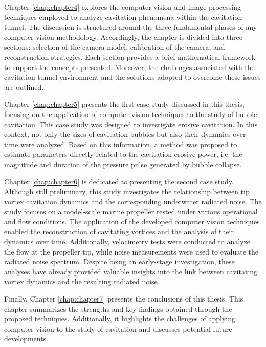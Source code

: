 Chapter \ref{chap:chapter4} explores the computer vision and image processing techniques employed to analyze cavitation phenomena within the cavitation tunnel. The discussion is structured around the three fundamental phases of any computer vision methodology. Accordingly, the chapter is divided into three sections: selection of the camera model, calibration of the camera, and reconstruction strategies. Each section provides a brief mathematical framework to support the concepts presented. Moreover, the challenges associated with the cavitation tunnel environment and the solutions adopted to overcome these issues are outlined.

Chapter \ref{chap:chapter5} presents the first case study discussed in this thesis, focusing on the application of computer vision techniques to the study of bubble cavitation.
This case study was designed to investigate erosive cavitation. In this context, not only the sizes of cavitation bubbles but also their dynamics over time were analyzed. Based on this information, a method was proposed to estimate parameters directly related to the cavitation erosive power, i.e. the magnitude and duration of the pressure pulse generated by bubble collapse.

Chapter \ref{chap:chapter6} is dedicated to presenting the second case study. Although still preliminary, this study investigates the relationship between tip vortex cavitation dynamics and the corresponding underwater radiated noise.
The study focuses on a model-scale marine propeller tested under various operational and flow conditions. The application of the developed computer vision techniques enabled the reconstruction of cavitating vortices and the analysis of their dynamics over time. 
Additionally, velocimetry tests were conducted to analyze the flow at the propeller tip, while noise measurements were used to evaluate the radiated noise spectrum.
Despite being an early-stage investigation, these analyses have already provided valuable insights into the link between cavitating vortex dynamics and the resulting radiated noise.

Finally, Chapter \ref{chap:chapter7} presents the conclusions of this thesis. This chapter summarizes the strengths and key findings obtained through the proposed techniques. Additionally, it highlights the challenges of applying computer vision to the study of cavitation and discusses potential future developments.



